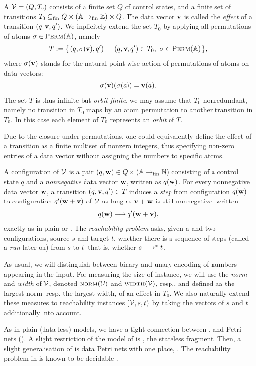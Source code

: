 \documentclass[a4paper,UKenglish,cleveref, autoref, thm-restate,dvipsnames,anonymous]{lipics-v2021}
\begin{document}
A \donevass $\mathcal{V} = (Q, T_0)$ consists of a finite set $Q$ of control states, and 
a finite set of transitions
$T_0\subseteq_{\text{fin}} Q\times (\mathbb{A}\to_{\text{fin}}\mathbb{Z})\times Q$. 
The data vector $\mathbf{v}$ is called the \emph{effect} of a transition $(q, \mathbf{v}, q')$.
We inplicitely extend the set $T_0$ by applying all permutations of atoms
$\sigma \in \textsc{Perm}(\mathbb{A})$, namely 
\[
T := \{\,(q, \sigma(\mathbf{v}), q') \ \mid \ (q, \mathbf{v}, q')\in T_0, \ \sigma \in \textsc{Perm}(\mathbb{A})\,\}, 
\]
where $\sigma(\mathbf{v})$ stands for the natural point-wise action of permutations of 
atoms on data vectors:
\[ \sigma(\mathbf{v})(\sigma(a)) = \mathbf{v}(a). \]
The set $T$ is thus infinite but \emph{orbit-finite}.
\Mywlog we may assume that $T_0$ nonredundant, namely no transition in $T_0$ maps
by an atom permutation to another transition in $T_0$.
In this case each element of $T_0$ represents an \emph{orbit} of $T$. 

\begin{remark}
Due to the closure under permutations, one could equivalently define the
effect of a transition as a finite multiset of nonzero integers, thus specifying non-zero
entries of a data vector without assigning the numbers to specific atoms.
\end{remark}

A configuration of $\mathcal{V}$ is a pair $(q, \mathbf{w}) \in Q\times (\mathbb{A}\to_{\text{fin}}\mathbb{N})$ consisting of
a control state $q$ and a \emph{nonnegative} data vector $\mathbf{w}$, written as $q(\mathbf{w})$.
For every nonnegative data vector $\mathbf{w}$, a transition $(q, \mathbf{v}, q') \in T$ induces 
a \emph{step} from configuration
$q(\mathbf{w})$ to configuration $q'(\mathbf{w}+\mathbf{v})$ of $\mathcal{V}$ as long as $\mathbf{v} + \mathbf{w}$ 
is still nonnegative, written
\[
q(\mathbf{w}) \longrightarrow q'(\mathbf{w} + \mathbf{v}),
\]
exactly as in plain \vass or \onevass.
The \emph{reachability problem} asks, given a \donevass and two configurations, source $s$
and target $t$, whether there is a sequence of steps (called a \emph{run} later on) 
from $s$ to $t$, that is, whether $s \longrightarrow^* t$.

As usual, we will distinguish between binary and unary encoding of numbers appearing in
the input.
%
For measuring the size of instance, we will use 
the \emph{norm} and \emph{width} of $\mathcal{V}$, denoted $\textsc{norm}(\mathcal{V})$ and $\textsc{width}(\mathcal{V})$, resp.,
and defined aa the largest norm, resp. the largest width, of an effect
in $T_0$.
We also naturally extend these measures to reachability instances $(\mathcal{V},s,t)$ by taking
the vectors of $s$ and $t$ additionally into account.

As in plain (data-less) models, we have a tight connection between \vass, \vas and Petri
nets (\pn).
A slight restriction of the model of \donevass is \donevas, the stateless fragment.
Then, 
a slight generalisation of \donevas is data Petri nets with one place,
\emph{\donepn}.
The reachability problem in \donepn is known to be decidable \cite{}.
\end{document}
